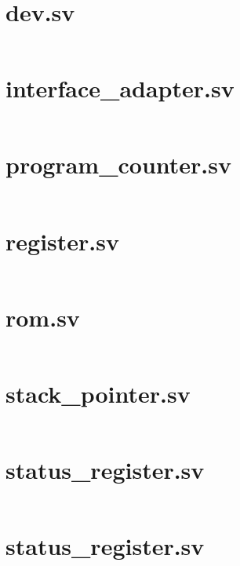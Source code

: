 \documentclass[
	12pt,				  %
	openright,		%
	a4paper,			%
	english,			%
	french,				%
	spanish,			%
	brazil,				%
]{abntex2}
\begin{document}
\begin{apendicesenv}
	\chapter{dev.sv}\label{attach:dev}
	\inputminted[breaklines]{systemverilog}{../quartus/synthesis/dev.sv}

	\chapter{interface{\_}adapter.sv}\label{attach:via}
	\inputminted[breaklines]{systemverilog}{../quartus/synthesis/interface_adapter.sv}

	\chapter{program{\_}counter.sv}\label{attach:pc}
	\inputminted[breaklines]{systemverilog}{../quartus/synthesis/program_counter.sv}

	\chapter{register.sv}\label{attach:reg}
	\inputminted[breaklines]{systemverilog}{../quartus/synthesis/register.sv}

	\chapter{rom.sv}\label{attach:rom}
	\inputminted[breaklines]{systemverilog}{../quartus/synthesis/rom.sv}

	\chapter{stack{\_}pointer.sv}\label{attach:sp}
	\inputminted[breaklines]{systemverilog}{../quartus/synthesis/stack_pointer.sv}

	\chapter{status{\_}register.sv}\label{attach:sr}
	\inputminted[breaklines]{systemverilog}{../quartus/synthesis/status_register.sv}

	\chapter{status{\_}register.sv}\label{attach:bus_sources}
	\inputminted[breaklines]{systemverilog}{../quartus/synthesis/enums/bus_sources.sv}


\end{apendicesenv}
\end{document}

